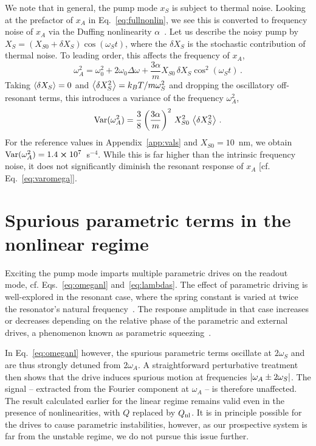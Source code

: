 We note that in general, the pump mode $x_S$ is subject to thermal noise. Looking at the prefactor of $x_A$ in Eq.~\eqref{eq:fullnonlin}, we see this is converted to frequency noise of $x_A$ via the Duffing nonlinearity $\alpha$~\cite{Kenig_2012, Villanueva_2013, Yurke_1995}. Let us describe the noisy pump by $X_S = (X_{S0} + \delta X_S)  \cos(\omega_S t)$, where the $\delta X_S$ is the stochastic contribution of thermal noise. To leading order, this affects the frequency of $x_A$,
\begin{equation}
\omega_A^2 = \omega_0^2 + 2 \omega_0 \Delta \omega + \frac{3 \alpha}{m} X_{S0}  \, \delta X_S \cos^2(\omega_S t) \,.
\end{equation}
Taking $\expval{\delta X_S} = 0$ and $\expval{\delta X_S^2} = k_B T /  m \omega_S^2$ and dropping the oscillatory off-resonant terms, this introduces a variance of the frequency $\omega_A^2$,
\begin{equation}
\text{Var}(\omega_A^2) = \frac{3}{8} \left(\frac{3 \alpha}{m}\right)^2 \, X_{S0}^2 \, \expval{\delta X_S^2} \,.
\end{equation}
For the reference values in Appendix~\ref{app:vals} and $X_{S0} = 10$~nm, we obtain $\text{Var}(\omega_A^2) = 1.4\cross10^7$~s$^{-4}$. While this is far higher than the intrinsic frequency noise, it does not significantly diminish the resonant response of $x_A$ [cf. Eq.~\eqref{eq:varomega}].


\section{Spurious parametric terms in the nonlinear regime} \label{app:parametric}

Exciting the pump mode imparts multiple parametric drives on the readout mode, cf. Eqs.~\eqref{eq:omeganl} and~\eqref{eq:lambdas}. The effect of parametric driving is well-explored in the resonant case, where the spring constant is varied at twice the resonator's natural frequency~\cite{Cleland_2005}. The response amplitude in that case increases or decreases depending on the relative phase of the parametric and external drives, a phenomenon known as parametric squeezing~\cite{Lifshitz_2008}. 

In Eq.~\eqref{eq:omeganl} however, the spurious parametric terms oscillate at $2 \omega_S$ and are thus strongly detuned from $2\omega_A$. A straightforward perturbative treatment then shows that the drive induces spurious motion at frequencies $\abs{\omega_A \pm 2 \omega_S}$. The signal -- extracted from the Fourier component at $\omega_A$ -- is therefore unaffected. The result calculated earlier for the linear regime remains valid even in the presence of nonlinearities, with $Q$ replaced by $Q_{\rm nl}$. It is in principle possible for the drives to cause parametric instabilities, however, as our prospective system is far from the unstable regime, we do not pursue this issue further.

